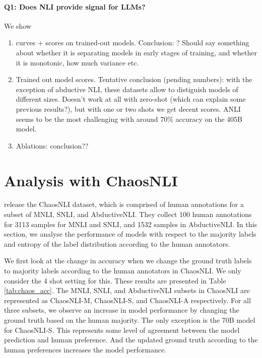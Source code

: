 \paragraph{Q1: Does NLI provide signal for LLMs?}
We show \begin{enumerate}
    \item curves + scores on trained-out models.  Conclusion: ? Should say something about whether it is separating models in early stages of training, and whether it is monotonic, how much variance etc.
    \item Trained out model scores. Tentative conclusion (pending numbers): with the exception of abductive NLI, these datasets allow to distiguish models of different sizes. Doesn't work at all with zero-shot (which can explain some previous results?), but with one or two shots we get decent scores. ANLI seems to be the most challenging with around 70\% accuracy on the 405B model.
    \item Ablations: conclusion??
\end{enumerate}

\section{Analysis with ChaosNLI}

\citet{nie-etal-2020-learn} release the ChaosNLI dataset, which is comprised of human annotations for a subset of MNLI, SNLI, and AbductiveNLI. They collect 100 human annotations for 3113 samples for MNLI and SNLI, and 1532 samples in AbductiveNLI. In this section, we analyse the performance of models with respect to the majority labels and entropy of the label distribution according to the human annotators.

We first look at the change in accuracy when we change the ground truth labels to majority labels according to the human annotators in ChaosNLI. We only consider the 4 shot setting for this. These results are presented in Table \ref{tab:chaos_acc}. The MNLI, SNLI, and AbductiveNLI subsets in ChaosNLI are represented as ChaosNLI-M, ChaosNLI-S, and ChaosNLI-A respectively. For all three subsets, we observe an increase in model performance by changing the ground truth based on the human majority. The only exception is the 70B model for ChaosNLI-S. This represents some level of agreement between the model prediction and human preference. And the updated ground truth according to the human preferences increases the model performance.


